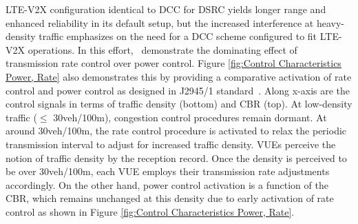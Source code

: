 \documentclass[iicol]{sn-jnl}%
\theoremstyle{thmstyleone}%
\theoremstyle{thmstyletwo}%
\theoremstyle{thmstylethree}%
\begin{document}
LTE-V2X configuration identical to DCC for DSRC yields longer range and enhanced reliability in its default setup, but the increased interference at heavy-density traffic emphasizes on the need for a DCC scheme configured to fit LTE-V2X operations. In this effort,~\cite{toghi2019analysis,yoon2020balancing} demonstrate the dominating effect of transmission rate control over power control. 
Figure \mbox{\ref{fig:Control Characteristics Power, Rate}} also demonstrates this by providing a comparative activation of rate control and power control as designed in J2945/1 standard\mbox{~\cite{saej2945}}. Along x-axis are the control signals in terms of traffic density (bottom) and CBR (top). At low-density traffic ($\leq$ 30veh/100m), congestion control procedures remain dormant. At around 30veh/100m, the rate control procedure is activated to relax the periodic transmission interval to adjust for increased traffic density. VUEs perceive the notion of traffic density by the reception record. Once the density is perceived to be over 30veh/100m, each VUE employs their transmission rate adjustments accordingly. On the other hand, power control activation is a function of the CBR, which remains unchanged at this density due to early activation of rate control as shown in Figure \mbox{\ref{fig:Control Characteristics Power, Rate}}.
\end{document}
